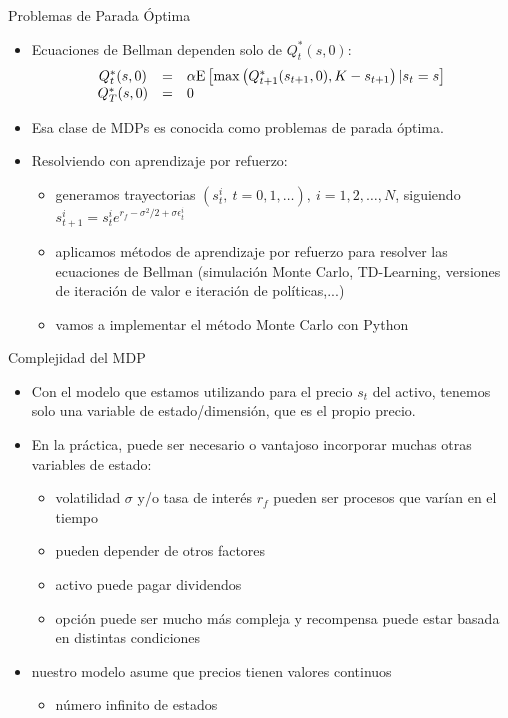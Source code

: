 \documentclass[handout]{beamer}
\begin{document}
\begin{frame}{Problemas de Parada Óptima}
\begin{itemize}
\item Ecuaciones de Bellman dependen solo de $Q_t^*(s,0)$:
$$
\begin{array}{ccl}
Q_t^*(s,0) & = & \alpha{\rm E}\left[\max\left(Q_{t+1}^*(s_{t+1},0),K-s_{t+1}\right) | s_t = s \right] \\
Q_T^*(s,0) & = & 0
\end{array}
$$
\item<2-> Esa clase de MDPs es conocida como problemas de parada óptima.
\item<3-> Resolviendo con aprendizaje por refuerzo:
\begin{itemize}
\item generamos trayectorias $(s_t^i,~t=0,1,\dots),~i=1,2,\dots,N$, siguiendo $s_{t+1}^i = s_t^i e^{r_f-\sigma^2/2+\sigma\epsilon_t^i}$ 
\item<4-> aplicamos métodos de aprendizaje por refuerzo para resolver las ecuaciones de Bellman (simulación Monte Carlo, TD-Learning, versiones de iteración de valor e iteración de políticas,...)
\item<5-> vamos a implementar el método Monte Carlo con Python
\end{itemize}
\end{itemize}    
\end{frame}
\begin{frame}{Complejidad del MDP}
\begin{itemize}
\item Con el modelo que estamos utilizando para el precio $s_t$ del activo, tenemos solo una variable de estado/dimensión, que es el propio precio.
\item<2-> En la práctica, puede ser necesario o vantajoso incorporar muchas otras variables de estado:
\begin{itemize}
\item<3-> volatilidad $\sigma$ y/o tasa de interés $r_f$ pueden ser procesos que varían en el tiempo	
\item<4-> pueden depender de otros factores
\item<5-> activo puede pagar dividendos
\item<6-> opción puede ser mucho más compleja y recompensa puede estar basada en distintas condiciones
\end{itemize}
\item<7-> nuestro modelo asume que precios tienen valores continuos 
\begin{itemize} 
\item número infinito de estados
\end{itemize}
\end{itemize}
\end{frame}
\end{document}
